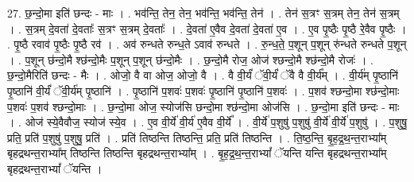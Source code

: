 \documentclass[17pt]{extarticle}
\begin{document}
27. छ॒न्दो॒मा इति॑ छन्दः - माः । . भव॑न्ति॒ तेन॒ तेन॒ भव॑न्ति॒ भव॑न्ति॒ तेन॑ । . तेन॑ स॒त्रꣳ स॒त्रम् तेन॒ तेन॑ स॒त्रम् । . स॒त्रम् दे॒वता॑ दे॒वताः᳚ स॒त्रꣳ स॒त्रम् दे॒वताः᳚ । . दे॒वता॑ ए॒वैव दे॒वता॑ दे॒वता॑ ए॒व । . ए॒व पृ॒ष्ठैः पृ॒ष्ठै रे॒वैव पृ॒ष्ठैः । . पृ॒ष्ठै रवाव॑ पृ॒ष्ठैः पृ॒ष्ठै रव॑ । . अव॑ रुन्धते रुन्ध॒ते ऽवाव॑ रुन्धते । . रु॒न्ध॒ते॒ प॒शून् प॒शून् रु॑न्धते रुन्धते प॒शून् । . प॒शून् छ॑न्दो॒मै श्छ॑न्दो॒मैः प॒शून् प॒शून् छ॑न्दो॒मैः । . छ॒न्दो॒मै रोज॒ ओज॑ श्छन्दो॒मै श्छ॑न्दो॒मै रोजः॑ । . छ॒न्दो॒मैरिति॑ छन्दः - मैः । . ओजो॒ वै वा ओज॒ ओजो॒ वै । . वै वी॒र्यं॑ ॅवी॒र्यं॑ ॅवै वै वी॒र्य᳚म् । . वी॒र्य॑म् पृ॒ष्ठानि॑ पृ॒ष्ठानि॑ वी॒र्यं॑ ॅवी॒र्य॑म् पृ॒ष्ठानि॑ । . पृ॒ष्ठानि॑ प॒शवः॑ प॒शवः॑ पृ॒ष्ठानि॑ पृ॒ष्ठानि॑ प॒शवः॑ । . प॒शव॑ श्छन्दो॒मा श्छ॑न्दो॒माः प॒शवः॑ प॒शव॑ श्छन्दो॒माः । . छ॒न्दो॒मा ओज॒ स्योज॑सि छन्दो॒मा श्छ॑न्दो॒मा ओज॑सि । . छ॒न्दो॒मा इति॑ छन्दः - माः । . ओज॑ स्ये॒वैवौज॒ स्योज॑ स्ये॒व । . ए॒व वी॒र्ये॑ वी॒र्य॑ ए॒वैव वी॒र्ये᳚ । . वी॒र्ये॑ प॒शुषु॑ प॒शुषु॑ वी॒र्ये॑ वी॒र्ये॑ प॒शुषु॑ । . प॒शुषु॒ प्रति॒ प्रति॑ प॒शुषु॑ प॒शुषु॒ प्रति॑ । . प्रति॑ तिष्ठन्ति तिष्ठन्ति॒ प्रति॒ प्रति॑ तिष्ठन्ति । . ति॒ष्ठ॒न्ति॒ बृ॒ह॒द्र॒थ॒न्त॒राभ्या᳚म् बृहद्रथन्त॒राभ्या᳚म् तिष्ठन्ति तिष्ठन्ति बृहद्रथन्त॒राभ्या᳚म् । . बृ॒ह॒द्र॒थ॒न्त॒राभ्यां᳚ ॅयन्ति यन्ति बृहद्रथन्त॒राभ्या᳚म् बृहद्रथन्त॒राभ्यां᳚ ॅयन्ति । \newline
\end{document}
